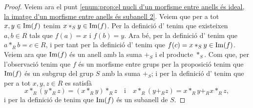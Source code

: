 \documentclass[../../Main.tex]{subfiles}
\begin{document}
\begin{proposition}
\begin{proof}
			Veiem ara el punt \eqref{enum:prop:el nucli d'un morfisme entre anells és ideal, la imatge d'un morfisme entre anells és subanell 2}. Veiem que per a tot \(x,y\in\operatorname{Im}(f)\) tenim \(x\ast_{S}y\in\operatorname{Im}(f)\). Per la definició d' tenim que existeixen \(a,b\in R\) tals que \(f(a)=x\) i \(f(b)=y\). Ara bé, per la definició d' tenim que \(a\ast_{R}b=c\in R\), i per tant per la definició d' tenim que \(f(c)=x\ast_{S}y\in\operatorname{Im}(f)\). Veiem ara que \(\operatorname{Im}(f)\) és un anell amb la suma \(+_{S}\) i el producte \(\ast_{S}\). Com que, per l'observació  tenim que \(f\) és un morfisme entre grups per la proposició  tenim que \(\operatorname{Im}(f)\) és un subgrup del grup \(S\) amb la suma \(+_{S}\); i per la definició d' tenim que per a tot \(x,y,z\in R\) es satisfà
			\[x\ast_{R}(y\ast_{R}z)=(x\ast_{R}y)\ast_{R}z\quad\text{i}\quad x\ast_{R}(y+_{R}z)=x\ast_{R}y+_{R}x\ast_{R}z,\]
			i per la definició de  tenim que \(\operatorname{Im}(f)\) és un subanell de \(S\).
		\end{proof}
	\end{proposition}
\end{document}
